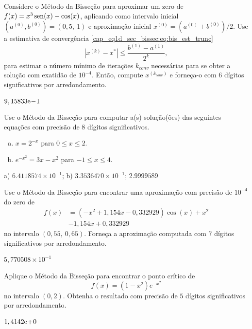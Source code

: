 \begin{exer}
  Considere o Método da Bisseção para aproximar um zero de $f(x)=x^3\operatorname{sen}(x)-\cos(x)$, aplicando como intervalo inicial $(a^{(0)}, b^{(0)}) = (0,5, ~1)$ e aproximação inicial $x^{(0)}=(a^{(0)}+b^{(0)})/2$. Use a estimativa de convergência \eqref{cap_eq1d_sec_bissec:eq:bis_est_trunc}
  \begin{equation}
    \left|x^{(k)} - x^{*}\right| \leq \frac{b^{(1)}-a^{(1)}}{2^k},
  \end{equation}
para estimar o número mínimo de iterações $k_{conv}$ necessárias para se obter a solução com exatidão de $10^{-4}$. Então, compute $x^{(k_{conv})}$ e forneça-o com $6$ dígitos significativos por arredondamento.
\end{exer}
\begin{resp}
  $9,15833\mathrm{e}\!-\!1$
\end{resp}

\begin{exer}
  Use o Método da Bisseção para computar a(s) solução(ões) das seguintes equações com precisão de 8 dígitos significativos.
  \begin{enumerate}[a)]
  \item $x = 2^{-x}$ para $0\leq x \leq 2$.
  \item $e^{-x^2} = 3x - x^2$ para $-1\leq x\leq 4$.
  \end{enumerate}
\end{exer}
\begin{resp}
  a) $6.4118574\times 10^{-1}$; b) $3.3536470\times 10^{-1}$; $2.9999589$
\end{resp}

\begin{exer}
  Use o Método da Bisseção para encontrar uma aproximação com precisão de $10^{-4}$ do zero de
  \begin{align}
    f(x) &= (-x^2+1,154x-0,332929)\cos(x) + x^2 \nonumber\\
         &- 1,154x + 0,332929
  \end{align}
no intervalo $(0,55, ~0,65)$. Forneça a aproximação computada com $7$ dígitos significativos por arredondamento.
\end{exer}
\begin{resp}
  $5,770508\times 10^{-1}$
\end{resp}

\begin{exer}
  Aplique o Método da Bisseção para encontrar o ponto crítico de
  \begin{equation}
    f(x) = (1-x^2)e^{-x^2}
  \end{equation}
  no intervalo $(0, 2)$. Obtenha o resultado com precisão de $5$ dígitos significativos por arredondamento.
\end{exer}
\begin{resp}
  $1,4142\mathrm{e}\!+\!0$
\end{resp}

